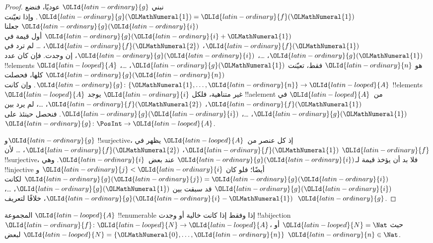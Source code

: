\documentclass[../../../include/open-logic-section]{subfiles}
\begin{document}
\begin{proof}
نبني $\OLId{latin-ordinary}{g}$ عوديًا، فنضع $\OLId{latin-ordinary}{g}(\OLMathNumeral{1}) = \OLId{latin-ordinary}{f}(\OLMathNumeral{1})$. وإذا تعيّنت $\OLId{latin-ordinary}{g}(\OLId{latin-ordinary}{i})$
جعلنا $\OLId{latin-ordinary}{g}(\OLId{latin-ordinary}{i}+\OLMathNumeral{1})$ أول قيمة في $\OLId{latin-ordinary}{f}(\OLMathNumeral{1})$، $\OLId{latin-ordinary}{f}(\OLMathNumeral{2})$، \dots{}
لم ترد في $\OLId{latin-ordinary}{g}(\OLMathNumeral{1})$، \dots، $\OLId{latin-ordinary}{g}(\OLId{latin-ordinary}{i})$، إن وجدت.
فإن كان عدد !!{element}s $\OLId{latin-looped}{A}$ هو $\OLId{latin-ordinary}{n}$ فقط، تعيّنت
$\OLId{latin-ordinary}{g}(\OLMathNumeral{1})$، \dots، $\OLId{latin-ordinary}{g}(\OLId{latin-ordinary}{n})$ كلها، فحصلت $\OLId{latin-ordinary}{g}\colon \{\OLMathNumeral{1}, \dots, \OLId{latin-ordinary}{n}\} \to \OLId{latin-looped}{A}$.
وإن كانت !!{element}s $\OLId{latin-looped}{A}$ غير متناهية، فلكل $\OLId{latin-ordinary}{i}$ يوجد !!a{element}
من~$\OLId{latin-looped}{A}$ في $\OLId{latin-ordinary}{f}(\OLMathNumeral{1})$، $\OLId{latin-ordinary}{f}(\OLMathNumeral{2})$، \dots، لم يرد بين $\OLId{latin-ordinary}{g}(\OLMathNumeral{1})$، \dots، $\OLId{latin-ordinary}{g}(\OLId{latin-ordinary}{i})$.
فنحصل حينئذ على $\OLId{latin-ordinary}{g}\colon \PosInt \to \OLId{latin-looped}{A}$.

و$\OLId{latin-ordinary}{g}$ !!{surjective}، إذ كل عنصر من~$\OLId{latin-looped}{A}$ يظهر في
$\OLId{latin-ordinary}{f}(\OLMathNumeral{1})$، $\OLId{latin-ordinary}{f}(\OLMathNumeral{2})$، \dots{} لأن $\OLId{latin-ordinary}{f}$ !!{surjective}، فلا بد أن يؤخذ
قيمة لـ$\OLId{latin-ordinary}{g}(\OLId{latin-ordinary}{i})$ عند بعض~$\OLId{latin-ordinary}{i}$. وهي !!{injective} أيضًا؛ فلو كان
$\OLId{latin-ordinary}{j} < \OLId{latin-ordinary}{i}$ و$\OLId{latin-ordinary}{g}(\OLId{latin-ordinary}{j}) = \OLId{latin-ordinary}{g}(\OLId{latin-ordinary}{i})$ لكانت $\OLId{latin-ordinary}{g}(\OLId{latin-ordinary}{i})$ قد سبقت بين
$\OLId{latin-ordinary}{g}(\OLMathNumeral{1})$، \dots، $\OLId{latin-ordinary}{g}(\OLId{latin-ordinary}{i}-\OLMathNumeral{1})$، خلافًا لتعريف~$\OLId{latin-ordinary}{g}$.
\end{proof}

\begin{cor}
المجموعة $\OLId{latin-looped}{A}$ !!{enumerable} إذا وفقط إذا كانت خالية أو وجدت
!!a{bijection} $\OLId{latin-ordinary}{f}\colon \OLId{latin-looped}{N} \to \OLId{latin-looped}{A}$، حيث $\OLId{latin-looped}{N} = \Nat$ أو
$\OLId{latin-looped}{N} = \{\OLMathNumeral{0}, \dots, \OLId{latin-ordinary}{n}\}$ لبعض $\OLId{latin-ordinary}{n} \in \Nat$.
\end{cor}
\end{document}
